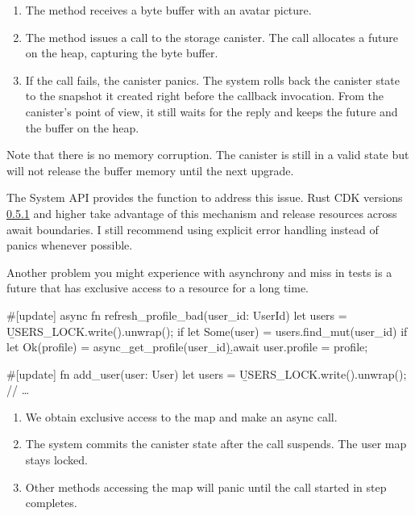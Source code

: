 \documentclass{article}
\begin{document}
\begin{enumerate}
\item The method receives a byte buffer with an avatar picture.
\item 
  The method issues a call to the storage canister.
  The call allocates a future on the heap, capturing the byte buffer.
\item  
  If the call fails, the canister panics.
  The system rolls back the canister state to the snapshot it created right before the callback invocation.
  From the canister's point of view, it still waits for the reply and keeps the future and the buffer on the heap.
\end{enumerate}

Note that there is no memory corruption.
The canister is still in a valid state but will not release the buffer memory until the next upgrade.

The System API provides the \href{https://sdk.dfinity.org/docs/interface-spec/index.html}{} function to address this issue.
Rust CDK versions \href{https://github.com/dfinity/cdk-rs/blob/c7aaaddaaf5e39c90a51035f87be68a0215c8c10/src/ic-cdk/CHANGELOG.md#fixed-4}{0.5.1} and higher take advantage of this mechanism and release resources across await boundaries.
I still recommend using explicit error handling instead of panics whenever possible.

Another problem you might experience with asynchrony and miss in tests is a future that has exclusive access to a resource for a long time.


\begin{code}[bad]
#[update]
async fn refresh_profile_bad(user_id: UserId) {
   let users = \b{USERS_LOCK.write().unwrap()}; 
   if let Some(user) = users.find_mut(user_id) {
       if let Ok(profile) = async_get_profile(user_id)\b{.await} { 
           user.profile = profile;
       }
   }
}

#[update]
fn add_user(user: User) {
    let users = \b{USERS_LOCK.write().unwrap()}; 
    // \ldots
}
\end{code}

\begin{enumerate}
\item We obtain exclusive access to the  map and make an async call.
\item The system commits the canister state after the call suspends. The user map stays locked.
\item Other methods accessing the map will panic until the call started in step  completes.
\end{enumerate}
\end{document}
